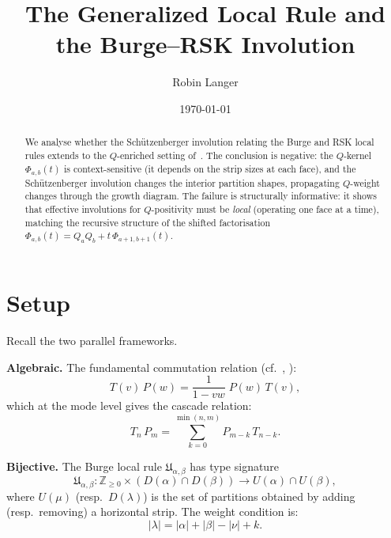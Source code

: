 \documentclass[11pt]{article}
\title{The Generalized Local Rule and the Burge--RSK Involution}
\author{Robin Langer}
\date{\today}
\newcommand{\Z}{\mathbb{Z}}
\theoremstyle{plain}
\theoremstyle{definition}
\begin{document}
\maketitle

\begin{abstract}
We analyse whether the Sch\"utzenberger involution relating the
Burge and RSK local rules extends to the $Q$-enriched setting
of~\cite{ADJOINT}.  The conclusion is negative: the $Q$-kernel
$\Phi_{a,b}(t)$ is context-sensitive (it depends on the strip
sizes at each face), and the Sch\"utzenberger involution changes
the interior partition shapes, propagating $Q$-weight changes
through the growth diagram.  The failure is structurally
informative: it shows that effective involutions for $Q$-positivity
must be \emph{local} (operating one face at a time), matching the
recursive structure of the shifted factorisation
$\Phi_{a,b}(t) = Q_a Q_b + t\,\Phi_{a+1,b+1}(t)$.
\end{abstract}

\tableofcontents


\section{Setup}
\label{sec:setup}

Recall the two parallel frameworks.

\medskip
\noindent\textbf{Algebraic.}
The fundamental commutation relation (cf.~\cite{COMMUTATION},
\cite{ADJOINT}):
\begin{equation}\label{eq:fund-comm}
  T(v)\, P(w) = \frac{1}{1-vw}\; P(w)\, T(v),
\end{equation}
which at the mode level gives the cascade relation:
\begin{equation}\label{eq:cascade}
  T_n\, P_m = \sum_{k=0}^{\min(n,m)} P_{m-k}\, T_{n-k}.
\end{equation}

\medskip
\noindent\textbf{Bijective.}
The Burge local rule $\mathfrak{U}_{\alpha,\beta}$ has type
signature
\begin{equation}\label{eq:type-sig}
  \mathfrak{U}_{\alpha,\beta}\colon
  \Z_{\geq 0} \times (D(\alpha) \cap D(\beta))
  \to U(\alpha) \cap U(\beta),
\end{equation}
where $U(\mu)$ (resp.\ $D(\lambda)$) is the set of partitions
obtained by adding (resp.\ removing) a horizontal strip.
The weight condition is:
\begin{equation}\label{eq:weight-cond}
  |\lambda| = |\alpha| + |\beta| - |\nu| + k.
\end{equation}
\end{document}
